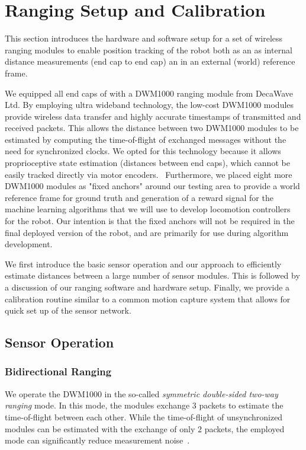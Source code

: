 \section{Ranging Setup and Calibration}
\label{ranging}
\label{txt:ranging}
This section introduces the hardware and software setup for a set of wireless ranging modules to enable 
position tracking of the robot both as an as internal distance measurements (end cap to end cap) an in an external (world) reference frame.

We equipped all end caps of \SB{} with a DWM1000 ranging module from DecaWave Ltd.
By employing ultra wideband technology, the low-cost DWM1000 modules provide wireless data transfer and highly accurate timestamps of transmitted and received packets. 
This allows the distance between two DWM1000 modules to be estimated by computing the time-of-flight of exchanged messages without the need for synchronized clocks.
We opted for this technology because it allows proprioceptive state estimation (distances between end caps), which 
cannot be easily tracked directly via motor encoders.~\cite{ledergerber2015}   Furthermore, we 
placed eight more DWM1000 modules as "fixed anchors" around our testing area to provide a world reference frame for
 ground truth and generation of a reward signal for the machine learning algorithms that we will use to develop 
 locomotion controllers for the robot.  Our intention is that the fixed anchors will not be required in the final deployed 
 version of the robot, and are primarily for use during algorithm development.

We first introduce the basic sensor operation and our approach to efficiently estimate distances between a large number of sensor modules.
This is followed by a discussion of our ranging software and hardware setup.
Finally, we provide a calibration routine similar to a common motion capture system that allows for quick set up of the sensor network.

\subsection{Sensor Operation}
\subsubsection{Bidirectional Ranging}
We operate the DWM1000 in the so-called \emph{symmetric double-sided two-way ranging} mode.
In this mode, the modules exchange $3$ packets to estimate the time-of-flight between each other.
While the time-of-flight of unsynchronized modules can be estimated with the exchange of only $2$ packets, the employed mode can significantly reduce measurement noise~\cite{decawave}.

